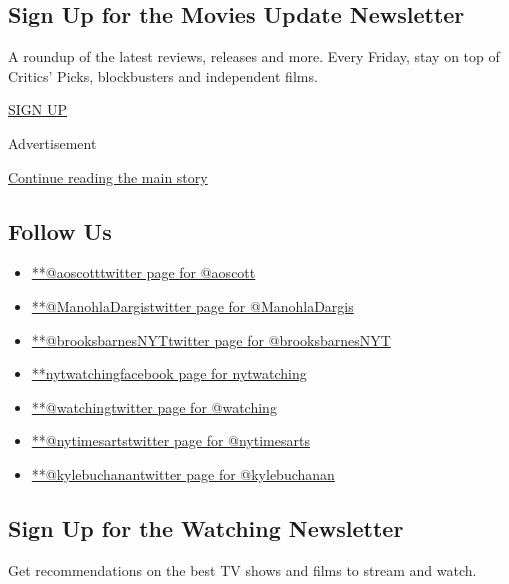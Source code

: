 \hypertarget{sign-up-for-the-movies-update-newsletter}{%
\subsection{Sign Up for the Movies Update
Newsletter}\label{sign-up-for-the-movies-update-newsletter}}

A roundup of the latest reviews, releases and more. Every Friday, stay
on top of Critics' Picks, blockbusters and independent films.

\href{/newsletters/signup/FM}{SIGN UP}

Advertisement

\protect\hyperlink{after-mktg}{Continue reading the main story}

\hypertarget{follow-us}{%
\subsection{Follow Us}\label{follow-us}}

\begin{itemize}
\tightlist
\item
  \href{https://twitter.com/aoscott}{**@aoscotttwitter page for
  @aoscott}
\item
  \href{https://twitter.com/ManohlaDargis}{**@ManohlaDargistwitter page
  for @ManohlaDargis}
\item
  \href{https://twitter.com/brooksbarnesNYT}{**@brooksbarnesNYTtwitter
  page for @brooksbarnesNYT}
\item
  \href{https://www.facebookcorewwwi.onion/nytwatching}{**nytwatchingfacebook
  page for nytwatching}
\item
  \href{https://twitter.com/watching}{**@watchingtwitter page for
  @watching}
\item
  \href{https://twitter.com/nytimesarts}{**@nytimesartstwitter page for
  @nytimesarts}
\item
  \href{https://twitter.com/kylebuchanan}{**@kylebuchanantwitter page
  for @kylebuchanan}
\end{itemize}

\hypertarget{sign-up-for-the-watching-newsletter}{%
\subsection{Sign Up for the Watching
Newsletter}\label{sign-up-for-the-watching-newsletter}}

Get recommendations on the best TV shows and films to stream and watch.

